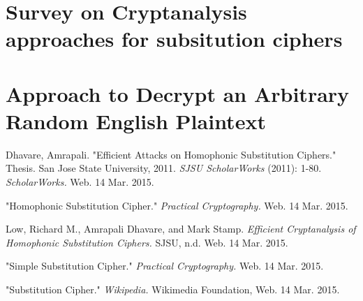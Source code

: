\documentclass[a4paper,twoside,10pt]{report}
\begin{document}
\section{Survey on Cryptanalysis approaches for subsitution ciphers}\label{approachessurvey}

\section{Approach to Decrypt an Arbitrary Random English Plaintext}



\clearpage
{}
\begin{thebibliography}{9}
Dhavare, Amrapali.
"Efficient Attacks on Homophonic Substitution Ciphers." Thesis. San Jose State University, 2011. 
\textit{SJSU ScholarWorks} (2011): 1-80. 
\textit{ScholarWorks.} 
Web. 14 Mar. 2015.
 
"Homophonic Substitution Cipher." 
\textit{Practical Cryptography.} 
Web. 14 Mar. 2015.
 
Low, Richard M., Amrapali Dhavare, and Mark Stamp. 
\textit{Efficient Cryptanalysis of Homophonic Substitution Ciphers.}
SJSU, n.d. Web. 14 Mar. 2015.

"Simple Substitution Cipher." 
\textit{Practical Cryptography.} 
Web. 14 Mar. 2015.

"Substitution Cipher." 
\textit{Wikipedia.} 
Wikimedia Foundation, Web. 14 Mar. 2015.
\end{thebibliography}

\appendix
\end{document}
